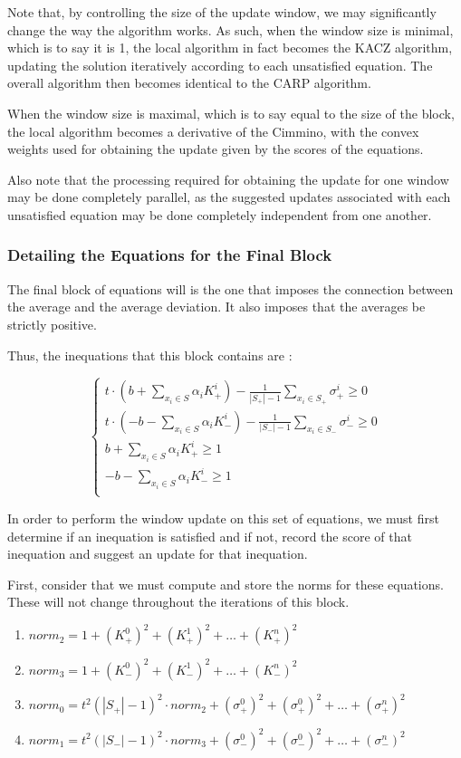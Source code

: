 \documentclass[a4paper,twoside,10pt]{report}
\begin{document}
	Note that, by controlling the size of the update window, we may significantly change the way the algorithm works. 
	As such, when the window size is minimal, which is to say it is 1, the local algorithm in fact becomes the KACZ algorithm, 
updating the solution iteratively according to each unsatisfied equation. The overall algorithm then becomes identical to the CARP algorithm.

	When the window size is maximal, which is to say equal to the size of the block, the local algorithm becomes a derivative of the Cimmino, 
with the convex weights used for obtaining the update given by the scores of the equations.

	Also note that the processing required for obtaining the update for one window may be done completely parallel, as the suggested updates 
associated with each unsatisfied equation may be done completely independent from one another. 
	
	\subsubsection{Detailing the Equations for the Final Block}
	
	The final block of equations will is the one that imposes the connection between the average and the average deviation. It also imposes that the averages be strictly positive.
	
	Thus, the inequations that this block contains are : 
	
	\[\left\{
		\begin{array}{l}
				t \cdot (b + \sum_{x_i\in S}{\alpha_i K^i_+}) - \frac{1}{|S_+| - 1} \sum_{x_i\in S_+} {\sigma_+^i} \geq 0\\
				t \cdot (- b - \sum_{x_i\in S}{\alpha_i K^i_-}) - \frac{1}{|S_-| - 1} \sum_{x_i\in S_-} {\sigma_-^i} \geq 0\\
				b + \sum_{x_i\in S}{\alpha_i K^i_+} \geq 1\\
				- b - \sum_{x_i\in S}{\alpha_i K^i_-} \geq 1\\	
		\end{array} \right.
	\]
	
	In order to perform the window update on this set of equations, we must first determine if an inequation is satisfied and if not, record the score of that inequation and suggest an update for that inequation.
	
	First, consider that we must compute and store the norms for these equations. These will not change throughout the iterations of this block.
	\begin{enumerate}
		\item \(norm_2 = 1 + (K_+^0)^2 + (K_+^1)^2 + \ldots + (K_+^n)^2\)
		\item \(norm_3 = 1 + (K_-^0)^2 + (K_-^1)^2 + \ldots + (K_-^n)^2\)
		\item \(norm_0 = t^2(|S_+| - 1)^2 \cdot norm_2 + (\sigma_+^0)^2 + (\sigma_+^0)^2 +  \ldots + (\sigma_+^n)^2\)
		\item \(norm_1 = t^2(|S_-| - 1)^2 \cdot norm_3 + (\sigma_-^0)^2 + (\sigma_-^0)^2 +  \ldots + (\sigma_-^n)^2\)
		
	\end{enumerate}
	
\end{document}
